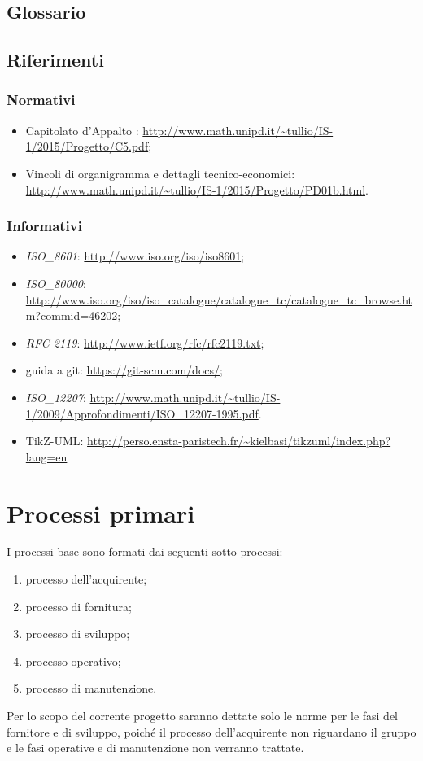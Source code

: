 \documentclass[12pt,a4paper]{article}
\begin{document}
\subsection{Glossario}\label{glossario}
\glossarioPrint

\subsection{Riferimenti}\label{riferimenti}

\subsubsection{Normativi}
\begin{itemize}
	\item Capitolato d’Appalto \prjL: \url{http://www.math.unipd.it/~tullio/IS-1/2015/Progetto/C5.pdf};
	\item Vincoli di organigramma e dettagli tecnico-economici: \url{http://www.math.unipd.it/~tullio/IS-1/2015/Progetto/PD01b.html}.
\end{itemize}

\subsubsection{Informativi}
\begin{itemize}
	\item \textit{ISO\_8601}: \url{http://www.iso.org/iso/iso8601};
	\item \textit{ISO\_80000}: \url{http://www.iso.org/iso/iso_catalogue/catalogue_tc/catalogue_tc_browse.htm?commid=46202};
	\item \textit{RFC 2119}: {\url{http://www.ietf.org/rfc/rfc2119.txt}};
	\item guida a git: \url{https://git-scm.com/docs/};
	\item \textit{ISO\_12207}: \url{http://www.math.unipd.it/~tullio/IS-1/2009/Approfondimenti/ISO_12207-1995.pdf}.
	\item TikZ-UML: \url{http://perso.ensta-paristech.fr/~kielbasi/tikzuml/index.php?lang=en}
\end{itemize}

\newpage

\section{Processi primari}
I processi base sono formati dai seguenti sotto processi:
\begin{enumerate}
\item processo dell'acquirente;
\item processo di fornitura;
\item processo di sviluppo;
\item processo operativo;
\item processo di manutenzione.
\end{enumerate}
Per lo scopo del corrente progetto saranno dettate solo le norme per le fasi del fornitore e di sviluppo, poiché il processo dell'acquirente non riguardano il gruppo e le fasi operative e di manutenzione non verranno trattate.
\end{document}

